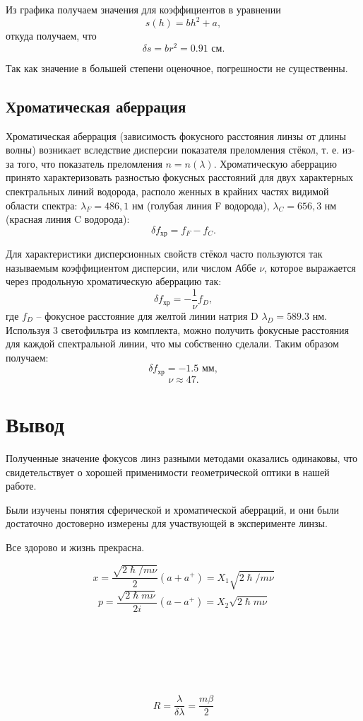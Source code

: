 \documentclass[a4paper, 14pt]{extarticle}%
\begin{document}
Из графика получаем значения для коэффициентов в уравнении 
\[s(h) = bh^2 +a, \]
откуда получаем, что 
\[\delta s = br^2 = 0.91 \text{ см}. \]

Так как значение в большей степени оценочное, погрешности не существенны.

\subsection{Хроматическая аберрация}

Хроматическая аберрация (зависимость
фокусного расстояния линзы от длины волны) возникает вследствие дисперсии показателя преломления стёкол, т. е. из-за того, что показатель
преломления $n = n(\lambda).$
Хроматическую аберрацию принято
характеризовать
разностью фокусных расстояний для двух
характерных спектральных
линий водорода, располо
женных в крайних частях видимой области
спектра:
$ \lambda_F
= 486,1 $ нм (голубая линия
F водорода),
$ \lambda_C
= 656,3 $ нм
(красная линия
C водорода):
\begin{equation}
\delta f_{\text{хр}} = f_F-f_C.
\end{equation}

Для
характеристики дисперсионных свойств стёкол часто пользуются
так называемым коэффициентом дисперсии, или числом Аббе $\nu$, которое выражается через продольную хроматическую аберрацию так:
\begin{equation}
\delta f_{\text{хр}} = -\frac{1}{\nu}f_D,
\end{equation}
где $f_D$ -- фокусное расстояние для желтой линии натрия D $\lambda_D = 589.3$ нм. 
\newpage
Используя 3 светофильтра из комплекта, можно получить фокусные расстояния для каждой спектральной линии, что мы собственно сделали. Таким образом получаем:
\[\delta f_{\text{хр}} = - 1.5 \text{ мм},\]
\[\nu \approx 47.\]

\section{Вывод}

Полученные значение фокусов линз разными методами оказались одинаковы, что свидетельствует о хорошей применимости геометрической оптики в нашей работе. 

Были изучены понятия сферической и хроматической аберраций, и они были достаточно достоверно измерены для участвующей в эксперименте линзы. 

Все здорово и жизнь прекрасна.















\[x = \dfrac{\sqrt{2\hslash/m\nu}}{2}(a+a^{+}) = X_1\sqrt{2\hslash/m\nu} \]
\[p = \dfrac{\sqrt{2\hslash m\nu}}{2i}(a-a^{+}) = X_2\sqrt{2\hslash m\nu} \]
\\ \\ \\ \\ \\ \\
\[R = \frac{\lambda}{\delta\lambda}=\frac{m\beta}{2}\]
\end{document}
